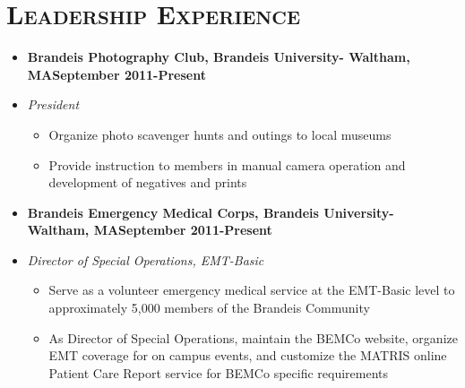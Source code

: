 \documentclass[10pt, oneside]{article}
\newcommand{\lr}[2]{#1\hfill#2}
\newenvironment{ressection}[1]{
  \section{\normalsize \scshape \selectfont #1 \normalfont}
  \vspace{-4pt}
  \begin{itemize} \itemsep-2pt
}{
  \end{itemize}
  \vspace{-20pt}
}
\newenvironment{resitem}[4]{
\item[] \lr{\bfseries \selectfont #1\normalfont, #2} {#3}
\item[] \textsl{#4}
  \vspace{-4pt}
  \begin{itemize} \itemsep-2pt
}{
  \end{itemize}
}
\begin{document}
\begin{ressection}{Leadership Experience}
  \begin{resitem}{Brandeis Photography Club}{Brandeis University- Waltham, MA}{September 2011-Present}{President}
  \item Organize photo scavenger hunts and outings to local museums
  \item Provide instruction to members in manual camera operation and development of negatives and prints
  \end{resitem}
  \begin{resitem}{Brandeis Emergency Medical Corps}{Brandeis University- Waltham, MA}{September 2011-Present}{Director of Special Operations, EMT-Basic}
  \item Serve as a volunteer emergency medical service at the EMT-Basic level to approximately 5,000 members of the Brandeis Community
  \item As Director of Special Operations, maintain the BEMCo website, organize EMT coverage for on campus events, and customize the MATRIS online Patient Care Report service for BEMCo specific requirements
  \end{resitem}
  \end{ressection}
\end{document}
